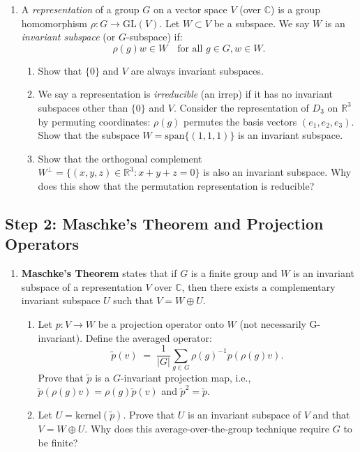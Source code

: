 \documentclass[12pt, a4paper]{article}
\newcommand{\newterm}[1]{\textit{\textcolor{DiscoveryColor}{#1}}}
\begin{document}
\begin{enumerate}[label=\textbf{E\arabic*.}]
  \item A \newterm{representation} of a group $G$ on a vector space $V$ (over $\mathbb{C}$) is a group homomorphism $\rho: G \to \text{GL}(V)$.
        Let $W \subset V$ be a subspace. We say $W$ is an \newterm{invariant subspace} (or $G$-subspace) if:
        \[
          \rho(g)w \in W \quad \text{for all } g \in G, w \in W.
        \]
        \begin{enumerate}[label=(\alph*)]
          \item Show that $\{0\}$ and $V$ are always invariant subspaces.
          \item We say a representation is \newterm{irreducible} (an irrep) if it has no invariant subspaces other than $\{0\}$ and $V$.
                Consider the representation of $D_3$ on $\mathbb{R}^3$ by permuting coordinates: $\rho(g)$ permutes the basis vectors $(e_1, e_2, e_3)$. Show that the subspace $W = \text{span}\{(1,1,1)\}$ is an invariant subspace.
          \item Show that the orthogonal complement $W^\perp = \{(x,y,z) \in \mathbb{R}^3 : x+y+z = 0\}$ is also an invariant subspace.
                Why does this show that the permutation representation is reducible?
        \end{enumerate}
\end{enumerate}

\subsection{Step 2: Maschke's Theorem and Projection Operators}

\begin{enumerate}[label=\textbf{E\arabic*.}]
  \item \textbf{Maschke's Theorem} states that if $G$ is a finite group and $W$ is an invariant subspace of a representation $V$ over $\mathbb{C}$, then there exists a complementary invariant subspace $U$ such that $V = W \oplus U$.
        \begin{enumerate}[label=(\alph*)]
          \item Let $p: V \to W$ be a projection operator onto $W$ (not necessarily G-invariant).
                Define the averaged operator:
                \[
                  \tilde{p}(v) \;=\; \frac{1}{|G|} \sum_{g \in G} \rho(g)^{-1} p(\rho(g)v).
                \]
                Prove that $\tilde{p}$ is a $G$-invariant projection map, i.e., $\tilde{p}(\rho(g)v) = \rho(g)\tilde{p}(v)$ and $\tilde{p}^2 = \tilde{p}$.
          \item Let $U = \text{kernel}(\tilde{p})$. Prove that $U$ is an invariant subspace of $V$ and that $V = W \oplus U$.
                Why does this average-over-the-group technique require $G$ to be finite?
        \end{enumerate}
\end{enumerate}
\end{document}
